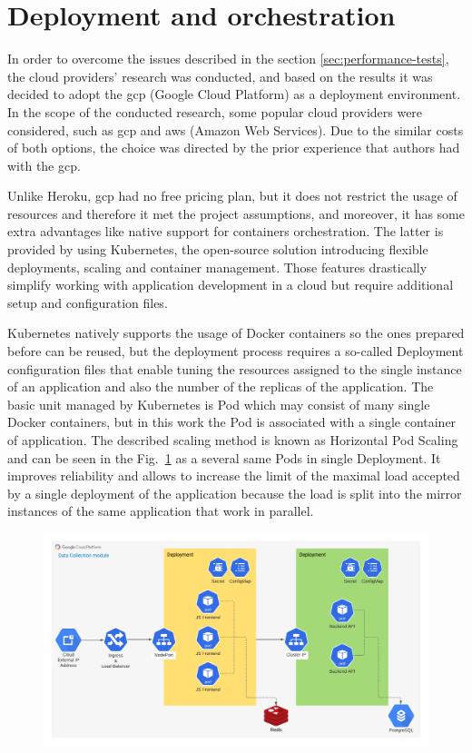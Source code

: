 \section{Deployment and orchestration}\label{sec:deployment-and-orchestration}
In order to overcome the issues described in the section \ref{sec:performance-tests}, the cloud providers' research was conducted, and based on the results it was decided to adopt the \gls{gcp} (Google Cloud Platform) as a deployment environment.
In the scope of the conducted research, some popular cloud providers were considered, such as \gls{gcp} and \gls{aws} (Amazon Web Services).
Due to the similar costs of both options, the choice was directed by the prior experience that authors had with the \gls{gcp}.

Unlike Heroku, \gls{gcp} had no free pricing plan, but it does not restrict the usage of resources and therefore it met the project assumptions, and moreover, it has some extra advantages like native support for containers orchestration.
The latter is provided by using Kubernetes, the open-source solution introducing flexible deployments, scaling and container management.
Those features drastically simplify working with application development in a cloud but require additional setup and configuration files.

Kubernetes natively supports the usage of Docker containers so the ones prepared before can be reused, but the deployment process requires a so-called Deployment configuration files that enable tuning the resources assigned to the single instance of an application and also the number of the replicas of the application.
The basic unit managed by Kubernetes is Pod which may consist of many single Docker containers, but in this work the Pod is associated with a single container of application.
The described scaling method is known as Horizontal Pod Scaling and can be seen in the Fig.~\ref{fig:gcp_diagram} as a several same Pods in single Deployment.
It improves reliability and allows to increase the limit of the maximal load accepted by a single deployment of the application because the load is split into the mirror instances of the same application that work in parallel.

\begin{figure}
    \includegraphics[width=\linewidth]{resources/gcp_diagram}
    \label{fig:gcp_diagram}
\end{figure}

